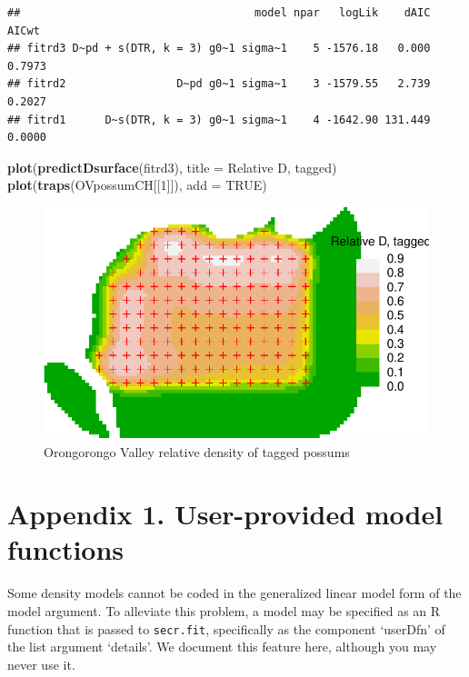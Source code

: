 \documentclass[
]{book}
\newenvironment{Shaded}{\begin{snugshade}}{\end{snugshade}}
\newcommand{\AttributeTok}[1]{\textcolor[rgb]{0.13,0.29,0.53}{#1}}
\newcommand{\ConstantTok}[1]{\textcolor[rgb]{0.56,0.35,0.01}{#1}}
\newcommand{\DecValTok}[1]{\textcolor[rgb]{0.00,0.00,0.81}{#1}}
\newcommand{\FunctionTok}[1]{\textcolor[rgb]{0.13,0.29,0.53}{\textbf{#1}}}
\newcommand{\NormalTok}[1]{#1}
\newcommand{\StringTok}[1]{\textcolor[rgb]{0.31,0.60,0.02}{#1}}
\begin{document}
\begin{verbatim}
##                                    model npar   logLik    dAIC  AICwt
## fitrd3 D~pd + s(DTR, k = 3) g0~1 sigma~1    5 -1576.18   0.000 0.7973
## fitrd2                 D~pd g0~1 sigma~1    3 -1579.55   2.739 0.2027
## fitrd1      D~s(DTR, k = 3) g0~1 sigma~1    4 -1642.90 131.449 0.0000
\end{verbatim}

\begin{Shaded}
\begin{Highlighting}[]
\FunctionTok{plot}\NormalTok{(}\FunctionTok{predictDsurface}\NormalTok{(fitrd3), }\AttributeTok{title =} \StringTok{\textquotesingle{}Relative D, tagged\textquotesingle{}}\NormalTok{)}
\FunctionTok{plot}\NormalTok{(}\FunctionTok{traps}\NormalTok{(OVpossumCH[[}\DecValTok{1}\NormalTok{]]), }\AttributeTok{add =} \ConstantTok{TRUE}\NormalTok{)}
\end{Highlighting}
\end{Shaded}

\begin{figure}
\includegraphics[width=0.95\linewidth]{SECRbook_files/figure-latex/relativeD3-1} \caption{Orongorongo Valley relative density of tagged possums}\label{fig:relativeD3}
\end{figure}

\section{Appendix 1. User-provided model functions}\label{userfnappendix}

Some density models cannot be coded in the generalized linear model form of the model argument. To alleviate this problem, a model may be specified as an R function that is passed to \texttt{secr.fit}, specifically as the component `userDfn' of the list argument `details'. We document this feature here, although you may never use it.
\end{document}

